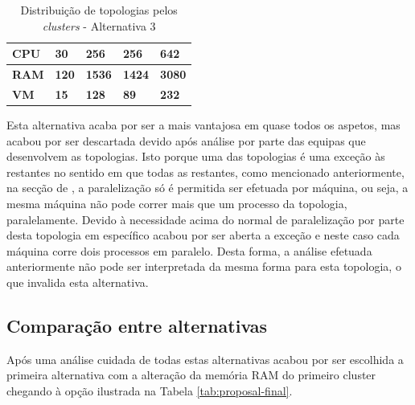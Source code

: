 \begin{table}[h!]
\begin{tabular}{|l|l|l|l|l|}
    \rowcolor[HTML]{D9D9D9} 
    \textbf{CPU} & \textbf{30} & \textbf{256} & \textbf{256} & \textbf{642} \\ \hline
    \rowcolor[HTML]{D9D9D9} 
    \textbf{RAM} & \textbf{120} & \textbf{1536} & \textbf{1424} & \textbf{3080} \\ \hline
    \rowcolor[HTML]{D9D9D9} 
    \textbf{VM} & \textbf{15} & \textbf{128} & \textbf{89} & \textbf{232} \\ \hline
  \end{tabular}
  \caption{Distribuição de topologias pelos \textit{clusters} - Alternativa 3}
  \label{tab:proposal-3}
\end{table}

Esta alternativa acaba por ser a mais vantajosa em quase todos os aspetos, mas acabou por ser 
descartada devido após análise por parte das equipas que desenvolvem as topologias. Isto porque uma 
das topologias é uma exceção às restantes no sentido em que todas as restantes, como mencionado 
anteriormente, na secção de , a paralelização só é permitida ser 
efetuada por máquina, ou seja, a mesma máquina não pode correr mais que um processo da topologia, 
paralelamente. Devido à necessidade acima do normal de paralelização por parte desta topologia em 
específico acabou por ser aberta a exceção e neste caso cada máquina corre dois processos em 
paralelo. Desta forma, a análise efetuada anteriormente não pode ser interpretada da mesma forma 
para esta topologia, o que invalida esta alternativa.

\subsection{Comparação entre alternativas}

Após uma análise cuidada de todas estas alternativas acabou por ser escolhida a primeira alternativa
com a alteração da memória RAM do primeiro \gls{cluster} chegando à opção ilustrada na Tabela
\ref{tab:proposal-final}.

